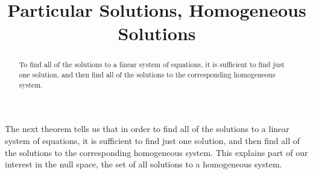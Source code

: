 \documentclass{ximera}
\title{Particular Solutions, Homogeneous Solutions}
\begin{document}
\begin{abstract}
  To find all of the solutions to a linear system of equations, it is
  sufficient to find just one solution, and then find all of the
  solutions to the corresponding homogeneous system.
\end{abstract}
\maketitle

The next theorem tells us that in order to find all of the solutions
to a linear system of equations, it is sufficient to find just one
solution, and then find all of the solutions to the corresponding
homogeneous system.  This explains part of our interest in the null
space, the set of all solutions to a homogeneous system.
\end{document}

